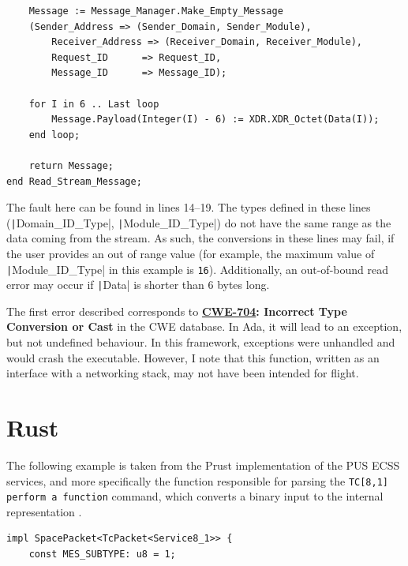 \documentclass[a4paper,nobib,justified,final]{tufte-book}
\begin{document}
\begin{fullwidth}
\begin{verbatim}
	Message := Message_Manager.Make_Empty_Message
	(Sender_Address => (Sender_Domain, Sender_Module),
		Receiver_Address => (Receiver_Domain, Receiver_Module),
		Request_ID      => Request_ID,
		Message_ID      => Message_ID);

	for I in 6 .. Last loop
		Message.Payload(Integer(I) - 6) := XDR.XDR_Octet(Data(I));
	end loop;

	return Message;
end Read_Stream_Message;
\end{verbatim}

The fault here can be found in lines 14--19. The types defined in these lines (\texttt|Domain_ID_Type|, \texttt|Module_ID_Type|\textellipsis) do not have the same range as the data coming from the stream. As such, the conversions in these lines may fail, if the user provides an out of range value (for example, the maximum value of \texttt|Module_ID_Type| in this example is \texttt{16}). Additionally, an out-of-bound read error may occur if \texttt|Data| is shorter than 6 bytes long.

The first error described corresponds to \textbf{\href{https://cwe.mitre.org/data/definitions/704.html}{CWE-704}: Incorrect Type Conversion or Cast} in the \acs{CWE} database. In Ada, it will lead to an exception, but not undefined behaviour. In this framework, exceptions were unhandled and would crash the executable. However, I note that this function, written as an interface with a networking stack, may not have been intended for flight.

\section*{Rust}

The following example is taken from the Prust implementation of the \acs{PUS} \acs{ECSS} services, and more specifically the function responsible for parsing the \texttt{TC[8,1] perform a function} command, which converts a binary input to the internal representation \cite{ozleyenOpenSourceImplementation2020}.

\begin{verbatim}
impl SpacePacket<TcPacket<Service8_1>> {
    const MES_SUBTYPE: u8 = 1;


\end{verbatim}
\end{fullwidth}
\end{document}
